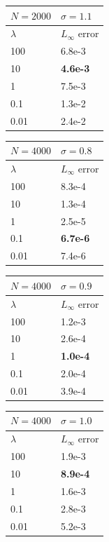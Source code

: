 \documentclass[letterpaper]{article}
\newcommand\T{\rule{0pt}{2.6ex}}       %
\newcommand\B{\rule[-1.2ex]{0pt}{0pt}} %
\begin{document}
\begin{table}[t]
\begin{center}
\begin{small}
\begin{tabular}{l l}
\hline
\T\B $N=2000$ & $\sigma=1.1$ \\
\hline
\T\B $\lambda$ & $L_{\infty}$ error \\
\hline
100    & 6.8e-3 \T \\
10     & \textbf{4.6e-3}  \\
1      & 7.5e-3  \\
0.1    & 1.3e-2  \\
0.01   & 2.4e-2 \B \\
\hline
\end{tabular}
\vskip 0.2in %
\begin{tabular}{l l}
\hline
\T\B $N=4000$ & $\sigma=0.8$ \\
\hline
\T\B $\lambda$ & $L_{\infty}$ error \\
\hline
100    & 8.3e-4 \T \\
10     & 1.3e-4  \\
1      & 2.5e-5  \\
0.1    & \textbf{6.7e-6}  \\
0.01   & 7.4e-6 \B \\
\hline
\end{tabular}
\quad %
\begin{tabular}{l l}
\hline
\T\B $N=4000$ & $\sigma=0.9$ \\
\hline
\T\B $\lambda$ & $L_{\infty}$ error \\
\hline
100    & 1.2e-3 \T \\
10     & 2.6e-4  \\
1      & \textbf{1.0e-4}  \\
0.1    & 2.0e-4  \\
0.01   & 3.9e-4 \B \\
\hline
\end{tabular}
\quad %
\begin{tabular}{l l}
\hline
\T\B $N=4000$ & $\sigma=1.0$ \\
\hline
\T\B $\lambda$ & $L_{\infty}$ error \\
\hline
100    & 1.9e-3 \T \\
10     & \textbf{8.9e-4}  \\
1      & 1.6e-3  \\
0.1    & 2.8e-3  \\
0.01   & 5.2e-3 \B \\
\hline
\end{tabular}
\quad %
\begin{tabular}{l l}

\end{tabular}
\end{small}
\end{center}
\end{table}
\end{document}
